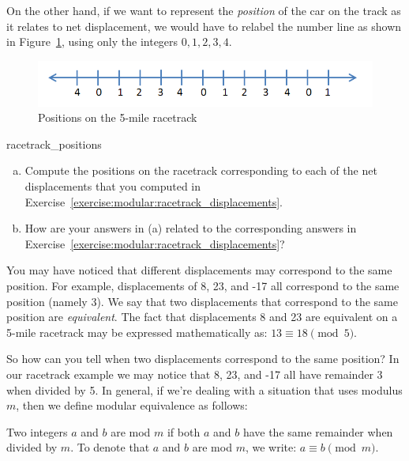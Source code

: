 On the other hand, if we want to represent the \emph{position} of the car on the track as it relates to net displacement, we would have to relabel the number line as shown in  Figure~\ref{fig:positions}, using only the integers $0,1,2,3,4$.   
\begin{figure}[h]
\begin{center}
\includegraphics[width=4.5in]{images/integers_mod_5.png}
\end{center}
\caption{\label{fig:positions}Positions on the 5-mile racetrack}
\end{figure}

\begin{exercise}{racetrack_positions}
\begin{enumerate}[(a)]
\item
Compute the positions on the racetrack corresponding to each of the net displacements that you computed in Exercise~\ref{exercise:modular:racetrack_displacements}.
\item
How are your answers in (a) related to the corresponding answers in Exercise~\ref{exercise:modular:racetrack_displacements}?
\end{enumerate}
\end{exercise}

You may have noticed that different displacements may correspond to the same position. For example, displacements of 8, 23, and -17 all correspond to the same position (namely 3). We say that two displacements that correspond to the same position are \emph{equivalent}. The fact that displacements 8 and 23 are equivalent on a 5-mile racetrack may be expressed mathematically as: $13 \equiv 18 \pmod{5}$.

So how can you tell when two displacements correspond to the same position?  
In our racetrack example we may notice that 8, 23, and -17 all  have remainder 3 when divided by 5. In general, if we're dealing with a situation that uses modulus $m$, then we define modular equivalence
as follows:

\begin{defn}\label{definition:modular:equivalence}
 Two integers $a$ and $b$ are  mod $m$  if both $a$ and $b$ have the same remainder when divided by $m$. To denote that $a$ and $b$ are  mod $m$, we write: $a \equiv b \pmod{m}$.
 \end{defn}

